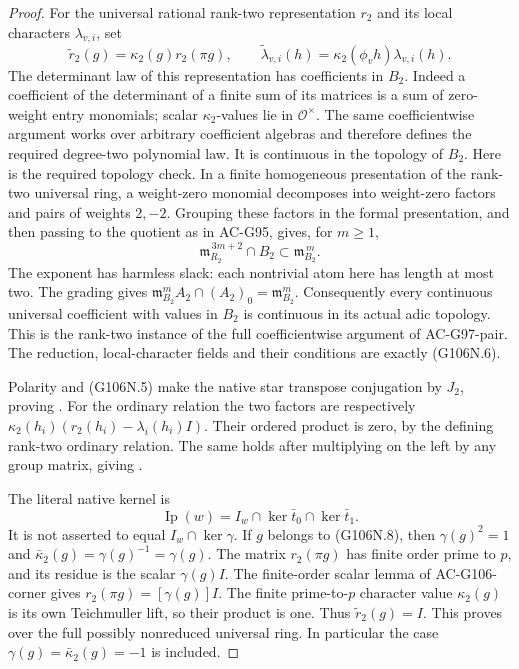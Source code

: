 \begin{proof}
For the universal rational rank-two representation \(r_2\)
and its local characters \(\lambda_{v,i}\), set
\[
 \widetilde r_2(g)=\kappa_2(g)r_2(\pi g),\qquad
 \widetilde\lambda_{v,i}(h)
       =\kappa_2(\phi_v h)\lambda_{v,i}(h).
\tag{G106N.7}
\]
The determinant law of this representation has coefficients
in \(B_2\). Indeed a coefficient of the determinant of
a finite sum of its matrices is a sum of zero-weight
entry monomials; scalar \(\kappa_2\)-values lie in
\(\mathcal O^\times\). The same coefficientwise
argument works over arbitrary coefficient algebras and
therefore defines the required degree-two polynomial law.
It is continuous in the topology of \(B_2\). Here is the
required topology check. In a finite homogeneous presentation
of the rank-two universal ring, a weight-zero monomial decomposes
into weight-zero factors and pairs of weights \(2,-2\).
Grouping these factors in the formal presentation, and then
passing to the quotient as in AC-G95, gives, for \(m\ge1\),
\[
       \mathfrak m_{R_2}^{\,3m+2}\cap B_2
                              \subset\mathfrak m_{B_2}^{\,m}.
\]
The exponent has harmless slack: each nontrivial atom here
has length at most two. The grading gives
\(\mathfrak m_{B_2}^mA_2\cap(A_2)_0=\mathfrak m_{B_2}^m\).
Consequently every continuous universal coefficient with
values in \(B_2\) is continuous in its actual adic topology.
This is the rank-two instance of the full coefficientwise
argument of AC-G97-pair. The reduction, local-character fields and
their  conditions are exactly (G106N.6).

Polarity and (G106N.5) make the native star transpose
conjugation by \(J_2\), proving .
For the ordinary relation the two factors are respectively
\(\kappa_2(h_i)(r_2(h_i)-\lambda_i(h_i)I)\).
Their ordered product is zero, by the defining rank-two
ordinary relation. The same holds after multiplying on
the left by any group matrix, giving .

The literal native kernel is
\[
                    \operatorname{Ip}(w)
              =I_w\cap\ker\bar t_0\cap\ker\bar t_1.
\tag{G106N.8}
\]
It is not asserted to equal \(I_w\cap\ker\gamma\).
If \(g\) belongs to (G106N.8), then
\(\gamma(g)^2=1\) and
\(\bar\kappa_2(g)=\gamma(g)^{-1}=\gamma(g)\).
The matrix \(r_2(\pi g)\) has finite order prime to
\(p\), and its residue is the scalar \(\gamma(g)I\).
The finite-order scalar lemma of AC-G106-corner gives
\(r_2(\pi g)=[\gamma(g)]I\).
The finite prime-to-\(p\) character value
\(\kappa_2(g)\) is its own Teichmuller lift, so their
product is one. Thus \(\widetilde r_2(g)=I\).
This proves  over the full possibly
nonreduced universal ring. In particular the case
\(\gamma(g)=\bar\kappa_2(g)=-1\) is included.


\end{proof}
